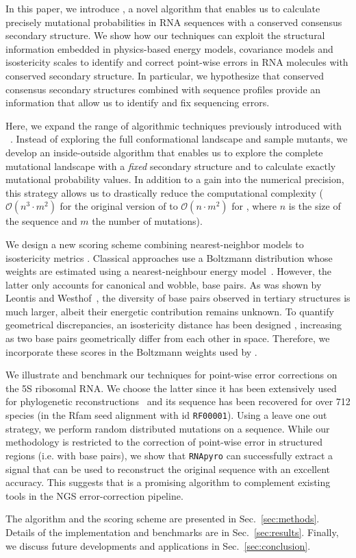 In this paper, we introduce \RNApyro, a novel algorithm that enables us to calculate precisely mutational probabilities in RNA sequences with a
conserved consensus secondary structure. We show how our techniques can exploit the structural information embedded in physics-based energy models, 
covariance models and isostericity scales to identify and correct point-wise errors in RNA molecules with conserved secondary structure. In particular, we 
hypothesize that  conserved consensus secondary structures combined with sequence profiles  provide an information that allow us to identify and fix sequencing errors.

Here, we expand the range of algorithmic techniques previously introduced with \RNAmutants~\cite{Waldispuhl2008}.
Instead of exploring the full conformational landscape and sample mutants, we develop an inside-outside algorithm that enables us
to explore the complete mutational landscape with a \emph{fixed} secondary structure and to calculate exactly mutational probability values. In addition
to a gain into the numerical precision, this strategy allows us to drastically reduce the computational complexity ($\mathcal{O}(n^3 \cdot m^2)$ for the
original version of  \RNAmutants to $\mathcal{O}(n \cdot m^2)$ for \RNApyro, where $n$ is the size of the sequence and $m$ the number of mutations).

We design a new scoring scheme combining nearest-neighbor models \cite{Turner2010} to isostericity metrics \cite{Stombaugh2009}.
Classical approaches use a Boltzmann distribution whose weights are estimated using a nearest-neighbour energy model~\cite{Turner2010}. However, the
latter only accounts for  canonical and wobble, base pairs. As was shown by Leontis and Westhof~\cite{Leontis2001},
the diversity of base pairs observed in tertiary structures is much larger, albeit their energetic contribution remains unknown. To quantify geometrical discrepancies, 
an isostericity distance has been designed \cite{Stombaugh2009}, increasing as two base pairs geometrically differ from each other in space. Therefore, we 
incorporate these scores in the Boltzmann weights used by \RNApyro.
 
We illustrate and benchmark our techniques for point-wise error corrections on the 5S ribosomal RNA. We choose the latter since it has been extensively
used for phylogenetic reconstructions~\cite{Hori1987} and its sequence has been recovered for over 712 species (in the Rfam seed alignment with id
\texttt{RF00001}). Using a leave one out strategy, we perform random distributed mutations on a sequence. While our methodology is restricted to the correction of 
point-wise error in structured regions (i.e. with base pairs), we show that \texttt{RNApyro} can successfully extract a signal that can be used to reconstruct the 
original sequence with an excellent accuracy. This suggests that \RNApyro is a promising algorithm to complement existing tools in the NGS error-correction 
pipeline.

The algorithm and the scoring scheme are presented in Sec.~\ref{sec:methods}. Details of the implementation and benchmarks are in Sec.~\ref{sec:results}. 
Finally, we discuss future developments and applications in Sec.~\ref{sec:conclusion}.